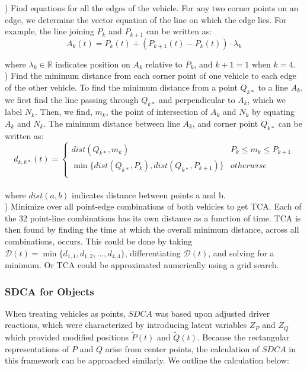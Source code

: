 \documentclass{article}
\begin{document}
) Find equations for all the edges of the vehicle. For any two corner points on an edge, we determine the vector equation of the line on which the edge lies. For example, the line joining $P_k$ and $P_{k+1}$ can be written as:
\begin{equation*}
A_k(t) = P_k(t) + (P_{k+1}(t)-P_k(t))\cdot\lambda_k
\end{equation*}

where $\lambda_k\in\mathbb{R}$ indicates position on $A_k$ relative to $P_k$, and $k + 1 = 1$ when $k = 4$. \\

) Find the minimum distance from each corner point of one vehicle to each edge of the other vehicle. To find the minimum distance from a point $Q_{k*}$ to a line $A_k$, we first find the line passing through $Q_{k*}$ and perpendicular to $A_k$, which we label $N_k$. Then, we find, $m_k$, the point of intersection of $A_k$ and $N_k$ by equating $A_k$ and $N_k$. The minimum distance between line $A_k$, and corner point $Q_{k*}$ can be written as:\\
\[d_{k,k*}(t) =   \left\{
\begin{array}{ll}
      dist(Q_{k*}, m_k) & P_k\leq m_k\leq P_{k+1}\\
      \min\{dist(Q_{k*}, P_k), dist(Q_{k*}, P_{k+1})\} & otherwise \\
\end{array} 
\right. \]\\
where $dist(a, b)$ indicates distance between points a and b.\\ 

) Minimize over all point-edge combinations of both vehicles to get TCA.  Each of the 32 point-line combinations has its own distance as a function of time. TCA is then found by finding the time at which the overall minimum distance, across all combinations, occurs. This could be done by taking $\mathcal{D}(t) = \min\{d_{1,1}, d_{1,2}, ..., d_{4,4}\}$, differentiating $\mathcal{D}(t)$, and solving for a minimum.  Or TCA could be approximated numerically using a grid search.

\subsubsection{SDCA for Objects}

When treating vehicles as points, $SDCA$ was based upon adjusted driver reactions, which were characterized by introducing latent variables $Z_P$ and $Z_Q$ which provided modified positions $\tilde{P}(t)$ and $\tilde{Q}(t)$.  Because the rectangular representations of $P$ and $Q$ arise from center points, the calculation of $SDCA$ in this framework can be approached similarly.  We outline the calculation below:
\end{document}
